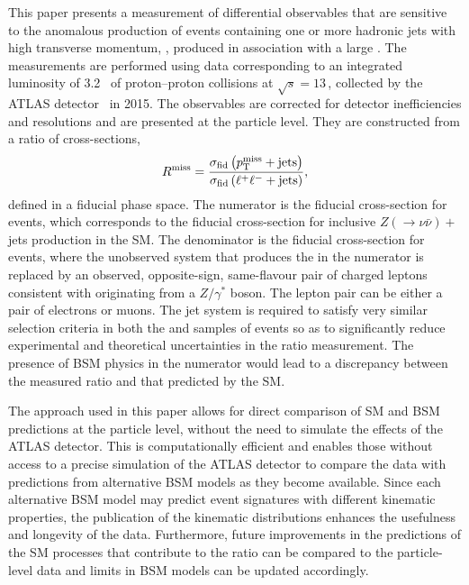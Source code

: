 \documentclass[cernpreprint,txfonts,UKenglish,texlive=2016]{\ATLASLATEXPATH atlasdoc}
\begin{document}
This paper presents a measurement of differential observables that are
sensitive to the anomalous production of events containing one or more
hadronic jets with high transverse momentum, \pt,  produced in
association with a large \ptmiss{}. The measurements are performed using data corresponding to an
integrated luminosity of 3.2~\ifb{} of proton--proton
collisions at $\sqrt{s}=13$\,\TeV, collected by the ATLAS
detector~\cite{PERF-2007-01} in 2015.
The observables  are corrected for detector inefficiencies and
resolutions and are presented at the
particle level. 
They are constructed from a ratio of cross-sections,
\begin{equation*}
R^{\mathrm{miss}} = \frac{\sigma_{\textrm{fid}} \left( p_\mathrm{T}^\mathrm{miss}{} + \mathrm{jets}{} \right)} {\sigma_{\textrm{fid}}  \left(\ell^+\ell^- + \mathrm{jets}{} \right)},
\end{equation*}
defined in a fiducial phase space. 
The numerator is the fiducial cross-section for \ptmissjet{} events, which corresponds to the fiducial cross-section 
for inclusive $Z(\to\nu\bar{\nu})+$ jets production in the SM.
The denominator is the fiducial cross-section for \lljet{} events, where the unobserved 
system that produces the \ptmiss{} in the numerator is replaced by an observed,
opposite-sign, same-flavour pair of charged leptons consistent with originating from a $Z/\gamma^\ast$ boson.
The lepton pair can be either a pair of electrons or muons. 
The jet system is required to satisfy very similar selection criteria in both the 
\ptmissjet{} and \lljet{} samples of events so as to significantly reduce experimental 
and theoretical uncertainties in the ratio measurement.
The presence of BSM physics in the numerator would lead to a discrepancy between the 
measured ratio and that predicted by the SM.

The approach used in this paper allows for direct comparison of 
SM and BSM predictions at the particle level, without the need to simulate the effects of the ATLAS detector.
This is computationally efficient and enables those without access to a precise simulation of 
the ATLAS detector to compare the data with
predictions from alternative BSM models as they become available.
Since each alternative BSM model may predict event signatures with
different kinematic properties, the publication of the kinematic
distributions enhances the usefulness and longevity of the data.
Furthermore, future improvements in the predictions of the SM processes that
contribute to the ratio can be compared to the particle-level data and
limits in BSM models can be updated accordingly.
\end{document}
